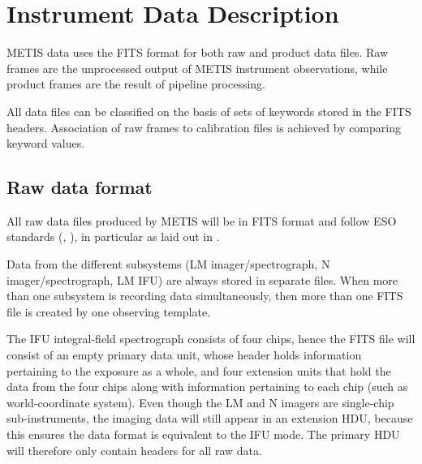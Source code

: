 
\clearpage
\section{Instrument Data Description}
\label{sec:instrument_data_description}

METIS data uses the FITS format for both raw and product data
files. Raw frames are the unprocessed output of METIS instrument
observations, while product frames are the result of pipeline
processing.

All data files can be classified on the basis of sets of keywords
stored in the FITS headers. Association of raw frames to calibration
files is achieved by comparing keyword values.


\subsection{Raw data format}
\label{ssec:instrument_data_format}

All raw data files produced by METIS will be in FITS format and follow
ESO standards (, ), in particular as
laid out in \cite{ESO-DICD}.

Data from the different subsystems (LM imager/spectrograph, N
imager/spectrograph, LM IFU) are always stored in separate files.
When more than one subsystem is recording data simultaneously, then
more than one FITS file is created by one observing template.

 The IFU
integral-field spectrograph consists of four chips, hence the FITS
file will consist of an empty primary data unit, whose header holds
information pertaining to the exposure as a whole, and four extension
units that hold the data from the four chips along with information
pertaining to each chip (such as world-coordinate system).
Even though the LM and N imagers are single-chip sub-instruments, the
imaging data will still appear in an extension HDU, because this ensures
the data format is equivalent to the IFU mode.
The primary HDU will therefore only contain headers for all raw data.


